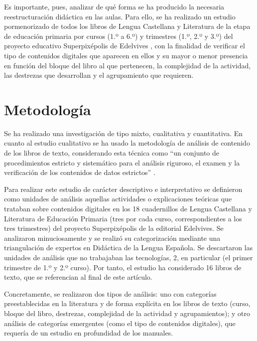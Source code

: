 \documentclass[spanish]{textolivre}
\begin{document}
Es importante, pues, analizar de qué forma se ha producido la necesaria reestructuración didáctica en las aulas. Para ello, se ha realizado un estudio pormenorizado de todos los libros de Lengua Castellana y Literatura de la etapa de educación primaria por cursos (1.º a 6.º) y trimestres (1.º, 2.º y 3.º) del proyecto educativo Superpixépolis de Edelvives \cite{araya_olazaran_lengua_2014-1,araya_olazaran_lengua_2014, araya_olazaran_lengua_2015-1,araya_olazaran_lengua_2015-2, araya_olazaran_lengua_2015-3,araya_olazaran_lengua_2015}, con la finalidad de verificar el tipo de contenidos digitales que aparecen en ellos y su mayor o menor presencia en función del bloque del libro al que pertenecen, la complejidad de la actividad, las destrezas que desarrollan y el agrupamiento que requieren.

\section{Metodología}\label{sec-metodologia}
Se ha realizado una investigación de tipo mixto, cualitativa y cuantitativa. En cuanto al estudio cualitativo se ha usado la metodología de análisis de contenido de los libros de texto, considerando esta técnica como “un conjunto de procedimientos estricto y sistemático para el análisis riguroso, el examen y la verificación de los contenidos de datos estrictos” \cite[p. 563]{cohen_research_2011}.

Para realizar este estudio de carácter descriptivo e interpretativo se definieron como unidades de análisis aquellas actividades o explicaciones teóricas que trataban sobre contenidos digitales en los 18 cuadernillos de Lengua Castellana y Literatura de Educación Primaria (tres por cada curso, correspondientes a los tres trimestres) del proyecto Superpixépolis de la editorial Edelvives. Se analizaron minuciosamente y se realizó su categorización mediante una triangulación de expertos en Didáctica de la Lengua Española. Se descartaron las unidades de análisis que no trabajaban las tecnologías, 2, en particular (el primer trimestre de 1.º y 2.º curso). Por tanto, el estudio ha considerado 16 libros de texto, que se referencian al final de este artículo. 

Concretamente, se realizaron dos tipos de análisis: uno con categorías preestablecidas en la literatura y de forma explícita en los libros de texto (curso, bloque del libro, destrezas, complejidad de la actividad y agrupamientos); y otro análisis de categorías emergentes (como el tipo de contenidos digitales), que requería de un estudio en profundidad de los manuales. 
\end{document}
